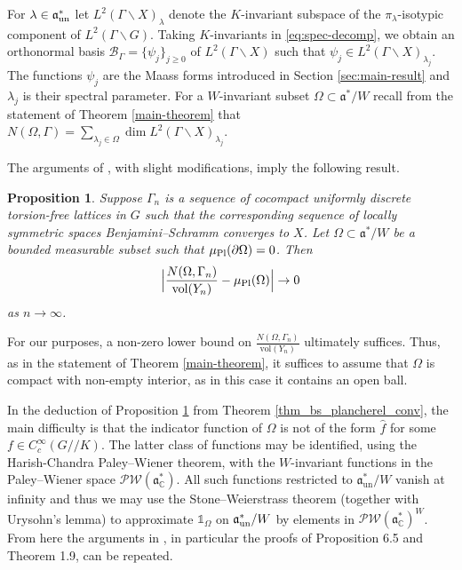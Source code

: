 \documentclass[12pt]{amsart}
\newtheorem{proposition}[theorem]{Proposition}
\theoremstyle{remark}
\newcommand{\ga}{\mathfrak a}
\begin{document}
For $\lambda\in\ga^*_{\rm un}$ let $L^2(\Gamma\backslash X)_\lambda$ denote the $K$-invariant subspace of the $\pi_\lambda$-isotypic component of $L^2(\Gamma\backslash G)$. Taking $K$-invariants in \eqref{eq:spec-decomp}, we obtain an orthonormal basis $\mathcal{B}_\Gamma=\{\psi_j\}_{j \geq 0}$ of $L^2(\Gamma\backslash X)$ such that $\psi_j\in L^2(\Gamma\backslash X)_{\lambda_j}$. The functions $\psi_j$ are the Maass forms introduced in Section \ref{sec:main-result} and $\lambda_j$ is their spectral parameter. For a $W$-invariant subset $\Omega\subset\ga^*/W$ recall from the statement of Theorem \ref{main-theorem} that $N(\Omega,\Gamma)=\sum_{\lambda_j\in\Omega}\dim L^2(\Gamma\backslash X)_{\lambda_j}$.

The arguments of \cite[\S 6]{Peterson_23}, with slight modifications, imply the following result. 

\begin{proposition} \label{prop_spectral_conv}
    Suppose $\Gamma_n$ is a sequence of cocompact uniformly discrete torsion-free lattices in $G$ such that the corresponding sequence of locally symmetric spaces Benjamini--Schramm converges to $X$. Let $\Omega \subset \ga^*/W$ be a bounded measurable subset such that $\mu_{\rm Pl}(\partial \Omega) = 0$. Then
    \begin{gather*}
        \Big| \frac{N(\Omega, \Gamma_n)}{\textnormal{vol}(Y_n)} - \mu_{\rm Pl}(\Omega) \Big| \to 0
    \end{gather*}
    as $n \to \infty$.
\end{proposition}


For our purposes, a non-zero lower bound on $\frac{N(\Omega, \Gamma_n)}{\text{vol}(Y_n)}$ ultimately suffices. Thus, as in the statement of Theorem \ref{main-theorem}, it suffices to assume that $\Omega$ is compact with non-empty interior, as in this case it contains an open ball.

In the deduction of Proposition \ref{prop_spectral_conv} from Theorem \ref{thm_bs_plancherel_conv}, the main difficulty is that the indicator function of $\Omega$ is not of the form $\widehat{f}$ for some $f \in C_c^\infty(G /\!\!/ K)$. The latter class of functions may be identified, using the Harish-Chandra Paley--Wiener theorem, with the $W$-invariant functions in the Paley--Wiener space $\mathcal{PW}(\ga^*_{\mathbb{C}})$. All such functions restricted to $\ga^*_{\text{un}}/W$ vanish at infinity and thus we may use the Stone--Weierstrass theorem (together with Urysohn's lemma) to approximate $\mathds{1}_\Omega$ on $\ga^*_{\textnormal{un}}/W$ by elements in $\mathcal{PW}(\ga^*_{\mathbb{C}})^W$. From here the arguments in \cite{Peterson_23}, in particular the proofs of Proposition 6.5 and Theorem 1.9, can be repeated.
\end{document}
